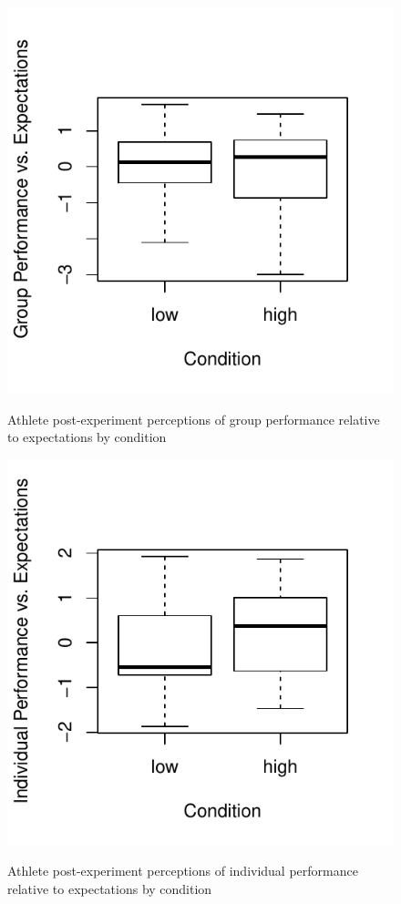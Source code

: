 \begin{figure}
  \centering
  \includegraphics[width=0.5\linewidth,keepaspectratio] {images/groupPerfExpPostBoxPlot-1}
          \label{fig:groupPerfExpPostBoxPlot}
        \caption{Athlete post-experiment perceptions of group performance relative to expectations by condition}
\end{figure}


\begin{figure}
  \centering
      \includegraphics[width=0.5\linewidth,keepaspectratio] {images/indPerfExpPostBoxPlot-1}
              \label{fig:indPerfExpPostBoxPlot}
              \caption{Athlete post-experiment perceptions of individual performance relative to expectations by condition}
\end{figure}


















